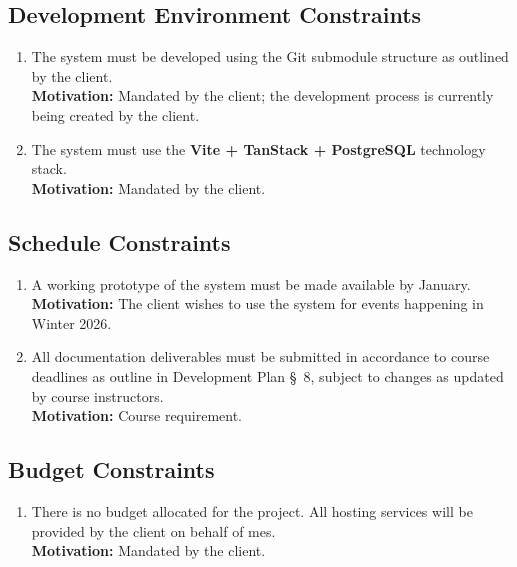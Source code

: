 \documentclass[12pt]{article}
\begin{document}
\subsection{Development Environment Constraints}
\begin{enumerate}[align=left,
  leftmargin=*,
  labelsep=1em,
  itemindent=0em,
  label=\bfseries DEC-\arabic*:]
  \item The system must be developed using the Git submodule structure as outlined by the client.\\[2mm]
    {\bf Motivation:} Mandated by the client; the development process is currently being created by the client.
  \item The system must use the {\bf Vite + TanStack + PostgreSQL} technology stack.\\[2mm]
    {\bf Motivation:} Mandated by the client.
\end{enumerate}

\subsection{Schedule Constraints}
\begin{enumerate}[align=left,
  leftmargin=*,
  labelsep=1em,
  itemindent=0em,
  label=\bfseries SCC-\arabic*:]
  \item A working prototype of the system must be made available by January.\\[2mm]
    {\bf Motivation:} The client wishes to use the system for events happening in Winter 2026.
  \item All documentation deliverables must be submitted in accordance to course deadlines as outline in Development
    Plan \S \ 8, subject to changes as updated by course instructors.\\[2mm]
    {\bf Motivation:} Course requirement.
\end{enumerate}

\subsection{Budget Constraints}
\begin{enumerate}[align=left,
  leftmargin=*,
  labelsep=1em,
  itemindent=0em,
  label=\bfseries BGC-\arabic*:]
  \item There is no budget allocated for the project. All hosting services will be provided by the client on behalf of
    \gls{mes}.\\[2mm]
    {\bf Motivation:} Mandated by the client.
\end{enumerate}
\end{document}
